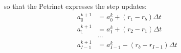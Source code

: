 \documentclass{article}
\begin{document}
\noindent so that the Petrinet expresses the step updates:
\begin{equation}
    \begin{split}
        a_0^{k+1} &= a_0^k + (r_1 - r_b)\Delta t\\
        a_1^{k+1} &= a_1^k + (r_2 - r_1)\Delta t\\
        &\ldots \\
        a_{I-1}^{k+1}&= a_{I-1}^k + (r_b - r_{I-1})\Delta t
    \end{split}
\end{equation}




\end{document}
